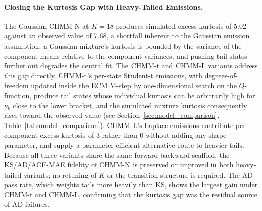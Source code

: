 \paragraph{Closing the Kurtosis Gap with Heavy-Tailed Emissions.}
The Gaussian CHMM-N at $K = 18$ produces simulated excess kurtosis of 5.02 against an observed value of 7.68, a shortfall inherent to the Gaussian emission assumption: a Gaussian mixture's kurtosis is bounded by the variance of the component means relative to the component variances, and pushing tail states further out degrades the central fit.
The CHMM-t and CHMM-L variants address this gap directly.
CHMM-t's per-state Student-t emissions, with degrees-of-freedom updated inside the ECM M-step by one-dimensional search on the $Q$-function, produce tail states whose individual kurtosis can be arbitrarily high for $\nu_k$ close to the lower bracket, and the simulated mixture kurtosis consequently rises toward the observed value (see Section~\ref{sec:model_comparison}, Table~\ref{tab:model_comparison}).
CHMM-L's Laplace emissions contribute per-component excess kurtosis of $3$ rather than $0$ without adding any shape parameter, and supply a parameter-efficient alternative route to heavier tails.
Because all three variants share the same forward-backward scaffold, the KS/AD/ACF-MAE fidelity of CHMM-N is preserved or improved in both heavy-tailed variants; no retuning of $K$ or the transition structure is required.
The AD pass rate, which weights tails more heavily than KS, shows the largest gain under CHMM-t and CHMM-L, confirming that the kurtosis gap was the residual source of AD failures.

